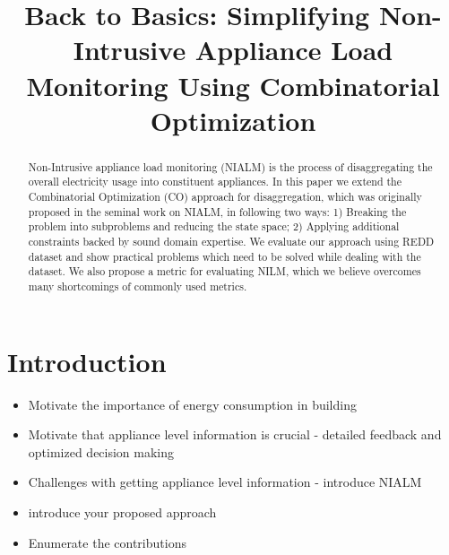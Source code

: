 \documentclass[conference]{IEEEtran}
\begin{document}
%
\title{Back to Basics: Simplifying Non-Intrusive Appliance Load Monitoring Using Combinatorial Optimization}


\author{
\and
{}
\and
{}
}
\maketitle


\begin{abstract}
Non-Intrusive appliance load monitoring (NIALM) is the process of disaggregating the overall electricity usage into constituent appliances. In this paper we extend the Combinatorial Optimization (CO) approach for disaggregation, which was originally proposed in the seminal work on NIALM, in following two ways: 1) Breaking the problem into subproblems and reducing the state space; 2) Applying additional constraints backed by sound domain expertise. We evaluate our approach using REDD dataset and show practical problems which need to be solved while dealing with the dataset. We also propose a metric for evaluating NILM, which we believe overcomes many shortcomings of commonly used metrics.
\end{abstract}
\IEEEpeerreviewmaketitle



\section{Introduction}
\begin{itemize}
\item Motivate the importance of energy consumption in building
\item Motivate that appliance level information is crucial - detailed feedback and optimized decision making \cite{darby}
\item Challenges with getting appliance level information - introduce NIALM~\cite{hart}
\item introduce your proposed approach
\item Enumerate the contributions
\end{itemize}
\end{document}
